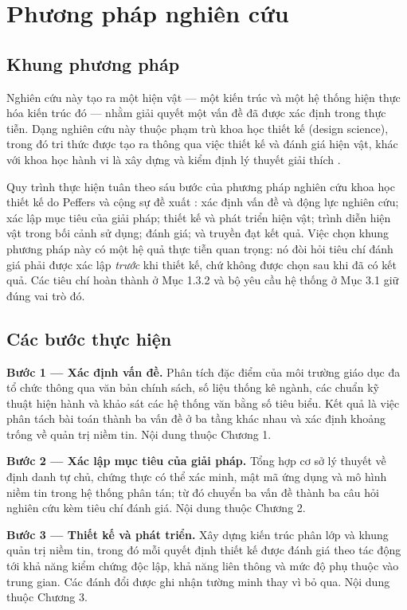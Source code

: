 \section{Phương pháp nghiên cứu}

\subsection{Khung phương pháp}

Nghiên cứu này tạo ra một hiện vật --- một kiến trúc và một hệ thống hiện thực hóa kiến trúc đó --- nhằm giải quyết một vấn đề đã được xác định trong thực tiễn. Dạng nghiên cứu này thuộc phạm trù khoa học thiết kế (design science), trong đó tri thức được tạo ra thông qua việc thiết kế và đánh giá hiện vật, khác với khoa học hành vi là xây dựng và kiểm định lý thuyết giải thích \cite{Hevner2004}.

Quy trình thực hiện tuân theo sáu bước của phương pháp nghiên cứu khoa học thiết kế do Peffers và cộng sự đề xuất \cite{Peffers2007}: xác định vấn đề và động lực nghiên cứu; xác lập mục tiêu của giải pháp; thiết kế và phát triển hiện vật; trình diễn hiện vật trong bối cảnh sử dụng; đánh giá; và truyền đạt kết quả. Việc chọn khung phương pháp này có một hệ quả thực tiễn quan trọng: nó đòi hỏi tiêu chí đánh giá phải được xác lập \emph{trước} khi thiết kế, chứ không được chọn sau khi đã có kết quả. Các tiêu chí hoàn thành ở Mục 1.3.2 và bộ yêu cầu hệ thống ở Mục 3.1 giữ đúng vai trò đó.

\subsection{Các bước thực hiện}

\noindent \textbf{Bước 1 --- Xác định vấn đề.} Phân tích đặc điểm của môi trường giáo dục đa tổ chức thông qua văn bản chính sách, số liệu thống kê ngành, các chuẩn kỹ thuật hiện hành và khảo sát các hệ thống văn bằng số tiêu biểu. Kết quả là việc phân tách bài toán thành ba vấn đề ở ba tầng khác nhau và xác định khoảng trống về quản trị niềm tin. Nội dung thuộc Chương 1.

\noindent \textbf{Bước 2 --- Xác lập mục tiêu của giải pháp.} Tổng hợp cơ sở lý thuyết về định danh tự chủ, chứng thực có thể xác minh, mật mã ứng dụng và mô hình niềm tin trong hệ thống phân tán; từ đó chuyển ba vấn đề thành ba câu hỏi nghiên cứu kèm tiêu chí đánh giá. Nội dung thuộc Chương 2.

\noindent \textbf{Bước 3 --- Thiết kế và phát triển.} Xây dựng kiến trúc phân lớp và khung quản trị niềm tin, trong đó mỗi quyết định thiết kế được đánh giá theo tác động tới khả năng kiểm chứng độc lập, khả năng liên thông và mức độ phụ thuộc vào trung gian. Các đánh đổi được ghi nhận tường minh thay vì bỏ qua. Nội dung thuộc Chương 3.

